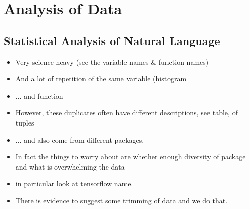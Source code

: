 \section{Analysis of Data} %
\label{sec:analysis_of_data}


\subsection{Statistical Analysis of Natural Language} %
\label{sub:statistical_analysis_of_natural_language}


\begin{itemize}
    \item Very science heavy (see the variable names \& function names)
    \item And a lot of repetition of the same variable (histogram
    \item ... and function
    \item However, these duplicates often have different descriptions, see table, of tuples
    \item ... and also come from different packages.
    \item In fact the things to worry about are whether enough diversity of package and what is overwhelming the data
    \item in particular look at tensorflow name.
    \item There is evidence to suggest some trimming of data and we do that.
\end{itemize}



